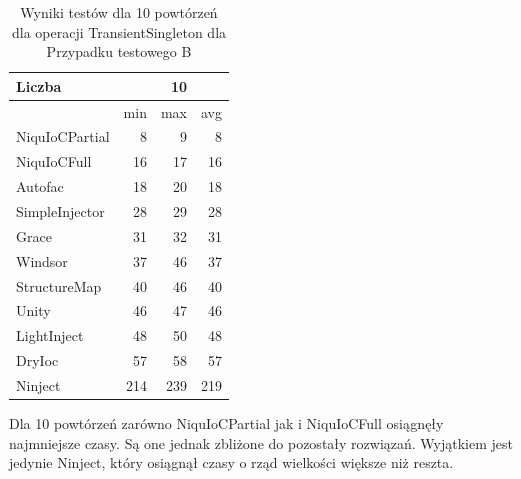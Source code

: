 \documentclass[12pt]{article}
\begin{document}
\begin{table}[H]
\captionsetup{belowskip=0pt,aboveskip=0pt}
\begin{center}
\begin{small}
	\begin{tabular}{ | l | r r r | }
    		\hline
Liczba & & 10 & \\ \hline
 & min & max & avg \\ \hline
NiquIoCPartial & 8 & 9 & 8 \\ \hline
NiquIoCFull & 16 & 17 & 16 \\ \hline
Autofac & 18 & 20 & 18 \\ \hline
SimpleInjector & 28 & 29 & 28 \\ \hline
Grace & 31 & 32 & 31 \\ \hline
Windsor & 37 & 46 & 37 \\ \hline
StructureMap & 40 & 46 & 40 \\ \hline
Unity & 46 & 47 & 46 \\ \hline
LightInject & 48 & 50 & 48 \\ \hline
DryIoc & 57 & 58 & 57 \\ \hline
Ninject & 214 & 239 & 219 \\ \hline
  	\end{tabular}
\end{small}
\end{center}
\caption{Wyniki testów dla 10 powtórzeń dla operacji TransientSingleton dla Przypadku testowego B}
\label{TestCaseB_TransientSingleton10}
\end{table}
Dla 10 powtórzeń zarówno NiquIoCPartial jak i NiquIoCFull osiągnęły najmniejsze czasy. Są one jednak zbliżone do pozostały rozwiązań. Wyjątkiem jest jedynie Ninject, który osiągnął czasy o rząd wielkości większe niż reszta.
\\ \\
\end{document}
